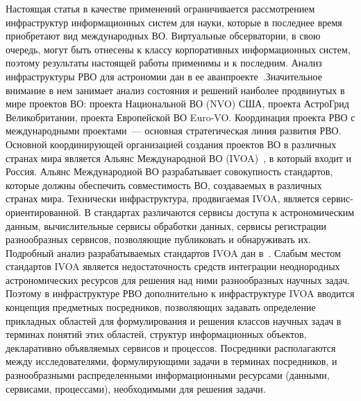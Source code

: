 \begin{multicols}{2}
     Настоящая статья в качестве применений ограничивается рассмотрением
инфраструктур информационных систем для науки, которые в последнее время
приобретают вид международных ВО. Виртуальные обсерватории, в
свою очередь, могут быть отнесены к классу корпоративных информационных систем,
поэтому результаты настоящей работы применимы и к последним. Анализ
инфраструктуры РВО для астрономии дан в ее
аванпроекте~\cite{Briu05}.Значительное внимание в нем занимает анализ состояния и
решений наиболее продвинутых в мире проектов ВО: проекта Национальной
ВО (NVO) США, проекта АстроГрид Великобритании, проекта Европейской
ВО Euro-VO. Координация проекта РВО с международными
проектами~--- основная стратегическая линия развития РВО. Основной координирующей
организацией создания проектов ВО в различных странах мира является Альянс
Международной ВО (IVOA)~\cite{VOarch}, в который входит и
Россия. Альянс  Международной ВО  разрабатывает совокупность
стандартов, которые должны обеспечить
совместимость ВО, создаваемых в различных странах мира. Технически инфраструктура,
продвигаемая IVOA, является сервис-ориентированной. В стандартах различаются
сервисы доступа к астрономическим данным, вычислительные сервисы обработки
данных, сервисы регистрации разнообразных сервисов, позволяющие публиковать и
обнаруживать их. Подробный анализ разрабатываемых стандартов IVOA дан
в~\cite{VOarch, BriuKl05}. Слабым местом стандартов IVOA является недостаточность
средств интеграции неоднородных астрономических ресурсов для решения над ними
разнообразных научных задач. Поэтому в инфраструктуре РВО дополнительно к
инфраструктуре IVOA вводится концепция предметных посредников, позволяющих
задавать определение прикладных областей для формулирования и решения классов
научных задач в терминах понятий этих областей, структур информационных объектов,
декларативно объявляемых сервисов и процессов. Посредники располагаются между
исследователями, формулирующими задачи в терминах посредников, и разнообразными
распределенными информационными ресурсами (данными, сервисами, процессами),
необходимыми для решения задачи.


\end{multicols}
